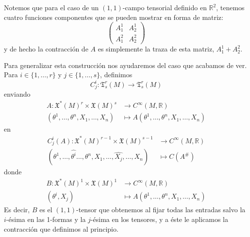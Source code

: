 \documentclass[spanish]{book}
\theoremstyle{definition}
\newcommand{\R}{\mathbb{R}}
\newcommand{\T}{\mathfrak{T}}
\newcommand{\Cinf}{C^\infty}
\begin{document}
	
	Notemos que para el caso de un $(1,1)$-campo tensorial definido en $\R^2$, tenemos cuatro funciones componentes que se pueden mostrar en forma de matriz:
	\[\begin{pmatrix}
		A^1_1&A^1_2\\
		A^2_1&A^2_2
	\end{pmatrix}\]
	y de hecho la contracción de $A$ es simplemente la traza de esta matriz, $A^1_1+A^2_2$.
	
	Para generalizar esta construcción nos ayudaremos del caso que acabamos de ver. Para $i\in\{1,\ldots,r\}$ y $j\in\{1,\ldots,s\}$, definimos
	\[C_j^i:\T_s^r(M)\to\T_s^r(M)\]
	enviando
	\begin{align*}
			A:\mathfrak{X}^*(M)^r\times\mathfrak{X}(M)^s&\to\Cinf(M,\R)\\
			(\theta^1,\ldots,\theta^n,X_1,\ldots,X_n)&\mapsto A(\theta^1,\ldots,\theta^n,X_1,\ldots,X_n)
	\end{align*}
	en
	\begin{align*}
		C^i_j(A):\mathfrak{X}^*(M)^{r-1}\times\mathfrak{X}(M)^{s-1}&\to\Cinf(M,\R)\\
		(\theta^1,\ldots,\hat{\theta^i}\ldots,\theta^n,X_1,\ldots,\hat{X_j},\ldots,X_n)&\mapsto C(A^\#)
	\end{align*}
	donde
	\begin{align*}
		B:\mathfrak{X}^*(M)^1\times\mathfrak{X}(M)^1&\to\Cinf(M,\R)\\
		(\theta^i,X_j)&\mapsto A(\theta^1,\ldots,\theta^n,X_1,\ldots,X_n)
	\end{align*}
	Es decir, $B$ es el $(1,1)$-tensor que obtenemos al fijar todas las entradas salvo la $i$-ésima en las 1-formas y la $j$-ésima en los tensores, y a éste le aplicamos la contracción que definimos al principio.
	
\end{document}
